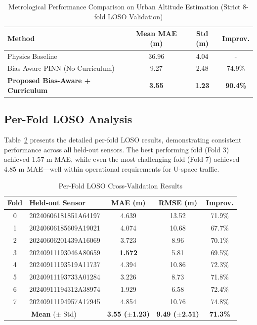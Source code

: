 \begin{table}[htbp]
\caption{Metrological Performance Comparison on Urban Altitude Estimation (Strict 8-fold LOSO Validation)}
\label{tab:main_results}
\centering
\begin{tabular}{lccc}
\toprule
\textbf{Method} & \textbf{Mean MAE (m)} & \textbf{Std (m)} & \textbf{Improv.} \\
\midrule
Physics Baseline & 36.96 & 4.04 & - \\
Bias-Aware PINN (No Curriculum) & 9.27 & 2.48 & 74.9\% \\
\midrule
\textbf{Proposed Bias-Aware + Curriculum} & \textbf{3.55} & \textbf{1.23} & \textbf{90.4\%} \\
\bottomrule
\end{tabular}
\end{table}

\subsection{Per-Fold LOSO Analysis}

Table~\ref{tab:per_fold} presents the detailed per-fold LOSO results, demonstrating consistent performance across all held-out sensors. The best performing fold (Fold 3) achieved 1.57 m MAE, while even the most challenging fold (Fold 7) achieved 4.85 m MAE---well within operational requirements for U-space traffic.

\begin{table}[htbp]
\caption{Per-Fold LOSO Cross-Validation Results}
\label{tab:per_fold}
\centering
\begin{tabular}{clccc}
\toprule
\textbf{Fold} & \textbf{Held-out Sensor} & \textbf{MAE (m)} & \textbf{RMSE (m)} & \textbf{Improv.} \\
\midrule
0 & 20240606181851A64197 & 4.639 & 13.52 & 71.9\% \\
1 & 20240606185609A19021 & 4.074 & 10.68 & 67.7\% \\
2 & 20240606201439A16069 & 3.723 & 8.96 & 70.1\% \\
3 & 20240911193046A80659 & \textbf{1.572} & 5.81 & 69.5\% \\
4 & 20240911193519A11737 & 4.394 & 10.86 & 72.3\% \\
5 & 20240911193733A01284 & 3.226 & 8.73 & 71.8\% \\
6 & 20240911194312A38974 & 1.929 & 6.58 & 72.4\% \\
7 & 20240911194957A17945 & 4.854 & 10.76 & 74.8\% \\
\midrule
\multicolumn{2}{c}{\textbf{Mean} ($\pm$ Std)} & \textbf{3.55 ($\pm$1.23)} & \textbf{9.49 ($\pm$2.51)} & \textbf{71.3\%} \\
\bottomrule
\end{tabular}
\end{table}

